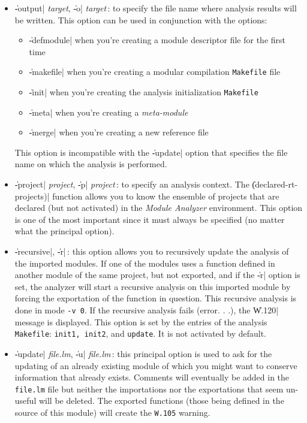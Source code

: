 \begin{itemize}
\item {\Large \|-output| {\em target}, \|-o| {\em target}}\,: to specify the file name where analysis results will be written.  This option can be used in conjunction with the options: 
\begin {itemize}
\item \|-defmodule| when you're creating a module descriptor
file for the first time
\item \|-makefile| when you're creating 
a modular compilation {\tt Makefile} file
\item \|-init| when you're creating 
the analysis initialization {\tt Makefile}
\item \|-meta| when
you're creating a {\em meta-module}
\item \|-merge| when you're creating a new reference file
\end{itemize}
This option is incompatible with the \|-update| option that specifies the file name on which the analysis is performed.

\item {\Large \|-project| {\em project}, \|-p| {\em project}}\,: to specify an analysis context.
The \|(declared-rt-projects)| function allows you to know the ensemble of projects that are declared (but not activated) in the {\em Module Analyzer} environment.
This option is one of the most important since it must always be specified (no matter what the principal option).

\item {\Large \|-recursive|, \|-r|}\,: this option allows you to recursively update the analysis of the imported modules.
If one of the modules uses a function defined in another module of the same project, but not exported, and if the \|-r| option is set, the analyzer will start a recursive analysis on this imported module by forcing the exportation of the function in question.  This recursive analysis is done in mode {\tt -v
0}.  If the recursive analysis fails (error. . .), the \|W.120| message is displayed. 
This option is set by the entries of the analysis {\tt Makefile}:  {\tt init1, init2}, and {\tt update}.  It is not activated by default.

\item {\Large \|-update| {\em file.lm}, \|-u| {\em file.lm}}\,: this principal option is used to ask for the updating of an already existing module of which you might want to conserve information that already exists.
Comments will eventually be added in the {\tt file.lm} file but neither the importations nor the exportations that seem un-useful will be deleted.  The exported functions (those being defined in the source of this module) will create the {\tt W.105} warning.


\end{itemize}
